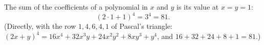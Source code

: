 The sum of the coefficients of a polynomial in $x$ and $y$ is its value at $x=y=1$:
\[(2\cdot1+1)^4=3^4=\boxed{81}.\]
(Directly, with the row $1,4,6,4,1$ of Pascal's triangle: $(2x+y)^4=16x^4+32x^3y+24x^2y^2+8xy^3+y^4$, and $16+32+24+8+1=81$.)
